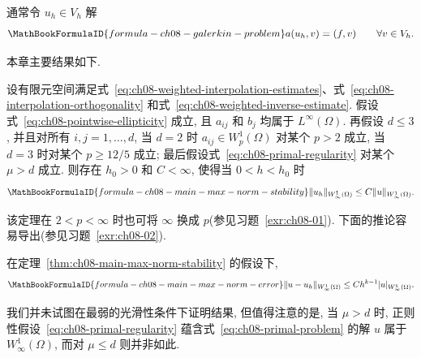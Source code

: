 通常令 $u_h\in V_h$ 解
\begin{equation}
\MathBookFormulaID{formula-ch08-galerkin-problem}
\label{eq:ch08-galerkin-problem}
a(u_h,v)=(f,v)
\qquad\forall v\in V_h.
\end{equation}

本章主要结果如下.

\begin{Theorem}
\label{thm:ch08-main-max-norm-stability}
设有限元空间满足式~\eqref{eq:ch08-weighted-interpolation-estimates}、式~\eqref{eq:ch08-interpolation-orthogonality} 和式~\eqref{eq:ch08-weighted-inverse-estimate}. 假设式~\eqref{eq:ch08-pointwise-ellipticity} 成立, 且 $a_{ij}$ 和 $b_j$ 均属于 $L^\infty(\Omega)$. 再假设 $d\leq3$, 并且对所有 $i,j=1,\ldots,d$, 当 $d=2$ 时 $a_{ij}\in W_p^1(\Omega)$ 对某个 $p>2$ 成立, 当 $d=3$ 时对某个 $p\geq12/5$ 成立; 最后假设式~\eqref{eq:ch08-primal-regularity} 对某个 $\mu>d$ 成立. 则存在 $h_0>0$ 和 $C<\infty$, 使得当 $0<h<h_0$ 时
\[
\MathBookFormulaID{formula-ch08-main-max-norm-stability}
\|u_h\|_{W_\infty^1(\Omega)}\leq C\|u\|_{W_\infty^1(\Omega)}.
\]
\end{Theorem}

该定理在 $2<p<\infty$ 时也可将 $\infty$ 换成 $p$(参见习题~\ref{exr:ch08-01}). 下面的推论容易导出(参见习题~\ref{exr:ch08-02}).

\begin{Corollary}
\label{cor:ch08-main-max-norm-error}
在定理~\ref{thm:ch08-main-max-norm-stability} 的假设下,
\[
\MathBookFormulaID{formula-ch08-main-max-norm-error}
\|u-u_h\|_{W_\infty^1(\Omega)}\leq Ch^{k-1}|u|_{W_\infty^k(\Omega)}.
\]
\end{Corollary}

\begin{Remark}
\label{rem:ch08-regularity-assumptions}
我们并未试图在最弱的光滑性条件下证明结果, 但值得注意的是, 当 $\mu>d$ 时, 正则性假设~\eqref{eq:ch08-primal-regularity} 蕴含式~\eqref{eq:ch08-primal-problem} 的解 $u$ 属于 $W_\infty^1(\Omega)$, 而对 $\mu\leq d$ 则并非如此.
\end{Remark}
